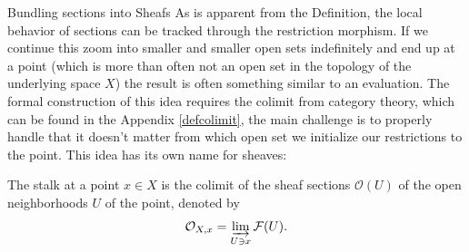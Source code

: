 \begin{subsection}{Bundling sections into Sheafs}
As is apparent from the Definition, the local behavior of sections can be tracked through the restriction morphism. If we continue this 
zoom into smaller and smaller open sets indefinitely and end up at a point (which is more than often not an open set in the topology of the underlying space \( X \)) the result is often something similar to an evaluation. The formal construction of this idea requires the colimit 
from category theory, which can be found in the Appendix \ref{defcolimit}, the main challenge is to properly handle that it doesn't matter
from which open set we initialize our restrictions to the point. This idea has its own name for sheaves: 

\begin{definition}
    The stalk at a point \( x \in X \) is the colimit of the sheaf sections \( \mathcal{O}(U) \) of the open neighborhoods \( U \) of the point,
    denoted by
    \[
        \mathcal{O}_{X,x} = \varinjlim_{U\ni x} \mathcal{F}(U).
    \]
\end{definition}


\end{subsection}
